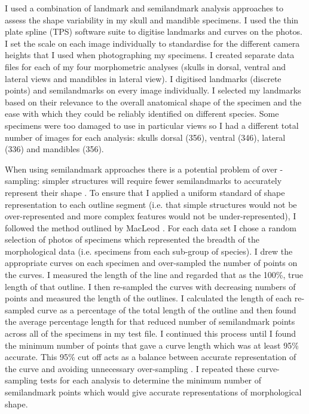 	I used a combination of landmark and semilandmark analysis approaches to assess the shape variability in my skull and mandible specimens.  I used the thin plate spline (TPS) software suite \citep{Rohlf2013} to digitise landmarks and curves on the photos. I set the scale on each image individually to standardise for the different camera heights that I used when photographing my specimens. I created separate data files for each of my four morphometric analyses (skulls in dorsal, ventral and lateral views and mandibles in lateral view). I digitised landmarks (discrete points) and semilandmarks \citep[points on a geometric feature, such as a curve, which are defined by their relative position on that feature,][]{Zelditch2012} on every image individually. I selected my landmarks based on their relevance to the overall anatomical shape of the specimen and the ease with which they could be reliably identified on different species. Some specimens were too damaged to use in particular views so I had a different total number of images for each analysis: skulls dorsal (356), ventral (346), lateral (336) and mandibles (356). 

	When using semilandmark approaches there is a potential problem of over -\\sampling: simpler structures will require fewer semilandmarks to accurately represent their shape  \citep{MacLeod2012}. To ensure that I applied a uniform standard of shape representation to each outline segment (i.e. that simple structures would not be over-represented and more complex features would not be under-represented), I followed the method outlined by MacLeod \citeyearpar{MacLeod2012}. For each data set I chose a random selection of photos of specimens which represented the breadth of the morphological data (i.e. specimens from each sub-group of species). I drew the appropriate curves on each specimen and over-sampled the number of points on the curves. I measured the length of the line and regarded that as the 100\%, true length of that outline. I then re-sampled the curves with decreasing numbers of points and measured the length of the outlines. I calculated the length of each re-sampled curve as a percentage of the total length of the outline and then found the average percentage length for that reduced number of semilandmark points across all of the specimens in my test file. I continued this process until I found the minimum number of points that gave a curve length which was at least 95\% accurate. This 95\% cut off acts as a balance between accurate representation of the curve and avoiding unnecessary over-sampling \citep{MacLeod2012}. I repeated these curve-sampling tests for each analysis to determine the minimum number of semilandmark points which would give accurate representations of morphological shape.
	
